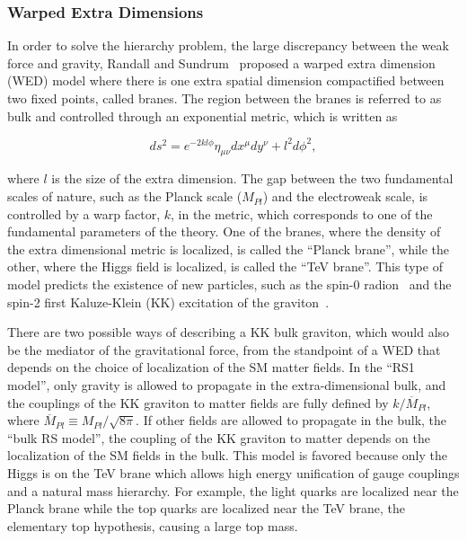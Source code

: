\subsubsection{Warped Extra Dimensions}

In order to solve the hierarchy problem, the large discrepancy between the weak force and gravity, Randall and Sundrum~\cite{RS} proposed a warped extra dimension (WED) model where there is one extra spatial dimension compactified between two fixed points, called branes. The region between the branes is referred to as bulk and controlled through an exponential metric, which is written as

\begin{equation}
ds^{2}= e^{-2kl\phi}\eta_{\mu\nu}dx^{\mu}dy^{\nu} + l^{2}d\phi^{2},
\end{equation}

\noindent
where $l$ is the size of the extra dimension. The gap between the two fundamental scales of nature, such as the Planck scale ($M_{Pl}$) and the electroweak scale, is controlled by a warp factor, $k$, in the metric, which corresponds to one of the fundamental parameters of the theory. One of the branes, where the density of the extra dimensional metric is localized, is called the ``Planck brane'', while the other, where the Higgs field is localized, is called the ``TeV brane''. This type of model predicts the existence of new particles, such as the spin-0 radion~\cite{Radion, Radion2, Radion3} and the spin-2 first Kaluze-Klein (KK) excitation of the graviton~\cite{Graviton, Graviton2, Graviton3}. 

There are two possible ways of describing a KK bulk graviton, which would also be the mediator of the gravitational force, from the standpoint of a WED that depends on the choice of localization of the SM matter fields. In the ``RS1 model'', only gravity is allowed to propagate in the extra-dimensional bulk, and the couplings of the KK graviton to matter fields are fully defined by $k/\overline{M}_{Pl}$, where $\overline{M}_{Pl}\equiv M_{Pl}/\sqrt{8\pi}$. If other fields are allowed to propagate in the bulk, the ``bulk RS model'', the coupling of the KK graviton to matter depends on the localization of the SM fields in the bulk. This model is favored because only the Higgs is on the TeV brane which allows high energy unification of gauge couplings and a natural mass hierarchy. For example, the light quarks are localized near the Planck brane while the top quarks are localized near the TeV brane, the elementary top hypothesis, causing a large top mass.

